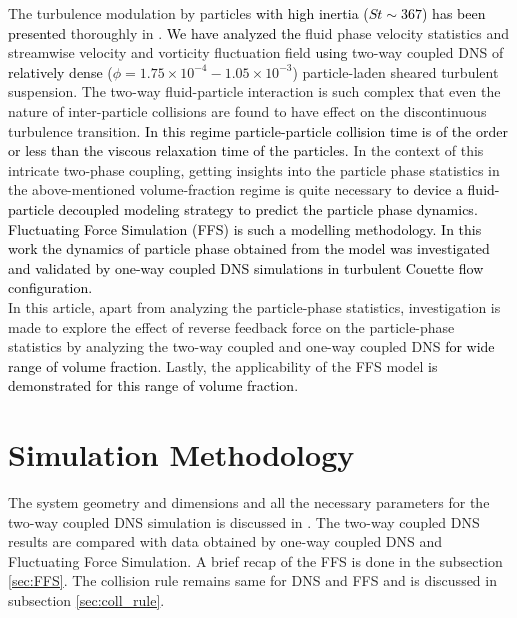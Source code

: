 \documentclass[notitlepage]{revtex4-1}
\begin{document}
The turbulence modulation by particles \textcolor{black}{with high inertia ($St\sim367$) has been presented} thoroughly in \citet{ghosh2022part1}. \textcolor{black}{We have analyzed the} fluid phase velocity statistics and streamwise velocity and vorticity fluctuation field \textcolor{black}{using} two-way coupled DNS of \textcolor{black}{relatively dense} ($\phi=1.75\times10^{-4}-1.05\times10^{-3}$) particle-laden sheared turbulent suspension. The two-way fluid-particle interaction is such complex that even the nature of inter-particle collisions are found to have effect on the discontinuous turbulence transition. \textcolor{black}{In this regime particle-particle collision time is of the order or less than the viscous relaxation time of the particles.}
In the context of this intricate two-phase coupling, getting insights into the particle phase statistics in the above-mentioned volume-fraction regime is quite necessary \textcolor{black}{to device a fluid-particle decoupled modeling strategy to predict the particle phase dynamics. Fluctuating Force Simulation (FFS)  \citep{goswami2010particle1,goswami2010particle} is such a modelling methodology. In this work the dynamics of particle phase obtained from the model was investigated and validated by one-way coupled DNS simulations in turbulent Couette flow configuration.} 
\\ In this article, apart from analyzing the particle-phase statistics, investigation is made to explore the effect of reverse feedback force on the particle-phase statistics by analyzing the two-way coupled and one-way coupled DNS \textcolor{black}{for wide range of volume fraction}. Lastly, the applicability of the FFS model \textcolor{black}{is demonstrated for this range of volume fraction}. 
\section{Simulation Methodology}
The system geometry and dimensions and all the necessary parameters for the two-way coupled DNS simulation is discussed in \citet{ghosh2022part1}. The two-way coupled DNS results are compared with data obtained by one-way coupled DNS and Fluctuating Force Simulation. A brief recap of the FFS is done in the subsection \ref{sec:FFS}. The collision rule remains same for DNS and FFS and is discussed in subsection \ref{sec:coll_rule}.
\end{document}
